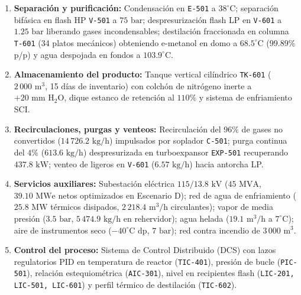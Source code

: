 \documentclass[10pt,letterpaper]{article}
\begin{document}
\begin{enumerate}
\begin{itemize}
        \begin{equation}
        \text{CO}_2 + 3\,\text{H}_2 \rightleftharpoons \text{CH}_3\text{OH} + \text{H}_2\text{O} \quad (\Delta H_{298\text{ K}}^\circ = -49.5\,\text{kJ/mol})
        \end{equation}
        \begin{equation}
        \text{CO}_2 + \text{H}_2 \rightleftharpoons \text{CO} + \text{H}_2\text{O} \quad (\text{RWGS}, \Delta H_{298\text{ K}}^\circ = +41.2\,\text{kJ/mol})
        \end{equation}
    \end{itemize}
    \item \textbf{Separación y purificación:} Condensación en \texttt{E-501} a $38^\circ\text{C}$; separación bifásica en flash HP \texttt{V-501} a $75\text{ bar}$; despresurización flash LP en \texttt{V-601} a $1.25\text{ bar}$ liberando gases incondensables; destilación fraccionada en columna \texttt{T-601} (34 platos mecánicos) obteniendo e-metanol en domo a $68.5^\circ\text{C}$ ($99.89\%$ p/p) y agua despojada en fondos a $103.9^\circ\text{C}$.
    \item \textbf{Almacenamiento del producto:} Tanque vertical cilíndrico \texttt{TK-601} ($2\,000\text{ m}^3$, 15 días de inventario) con colchón de nitrógeno inerte a $+20\text{ mm H}_2\text{O}$, dique estanco de retención al $110\%$ y sistema de enfriamiento SCI.
    \item \textbf{Recirculaciones, purgas y venteos:} Recirculación del $96\%$ de gases no convertidos ($14\,726.2\text{ kg/h}$) impulsados por soplador \texttt{C-501}; purga continua del $4\%$ ($613.6\text{ kg/h}$) despresurizada en turboexpansor \texttt{EXP-501} recuperando $437.8\text{ kW}$; venteo de ligeros en \texttt{V-601} ($6.57\text{ kg/h}$) hacia antorcha LP.
    \item \textbf{Servicios auxiliares:} Subestación eléctrica $115/13.8\text{ kV}$ ($45\text{ MVA}$, $39.10\text{ MWe}$ netos optimizados en Escenario D); red de agua de enfriamiento ($25.8\text{ MW}$ térmicos disipados, $2\,218.4\text{ m}^3\text{/h}$ circulantes); vapor de media presión ($3.5\text{ bar}$, $5\,474.9\text{ kg/h}$ en rehervidor); agua helada ($19.1\text{ m}^3\text{/h}$ a $7^\circ\text{C}$); aire de instrumentos seco ($-40^\circ\text{C}$ dp, $7\text{ bar}$); red contra incendio de $3\,000\text{ m}^3$.
    \item \textbf{Control del proceso:} Sistema de Control Distribuido (DCS) con lazos regulatorios PID en temperatura de reactor (\texttt{TIC-401}), presión de bucle (\texttt{PIC-501}), relación estequiométrica (\texttt{AIC-301}), nivel en recipientes flash (\texttt{LIC-201, LIC-501, LIC-601}) y perfil térmico de destilación (\texttt{TIC-602}).

\end{enumerate}
\end{document}
